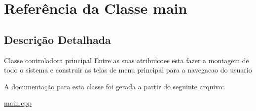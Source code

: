 \hypertarget{classmain}{}\section{Referência da Classe main}
\label{classmain}


\subsection{Descrição Detalhada}
Classe controladora principal Entre as suas atribuicoes esta fazer a montagem de todo o sistema e construir as telas de menu principal para a navegacao do usuario 

A documentação para esta classe foi gerada a partir do seguinte arquivo\+:\begin{DoxyCompactItemize}
\item 
\hyperlink{main_8cpp}{main.\+cpp}\end{DoxyCompactItemize}
